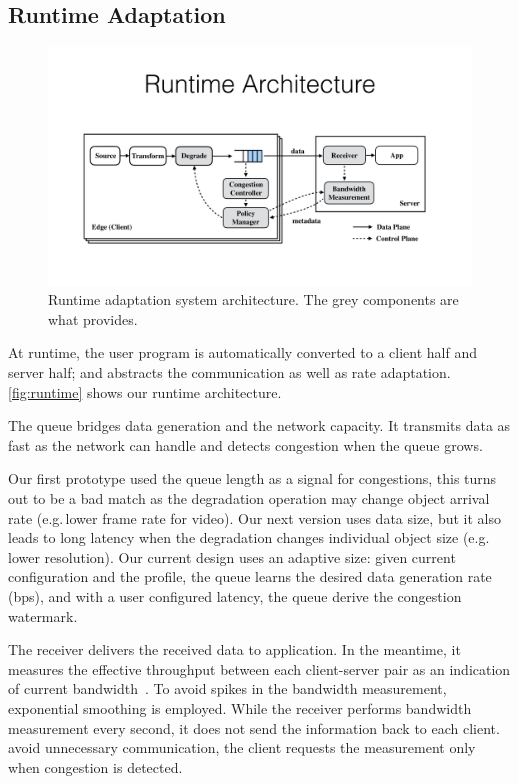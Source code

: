 \subsection{Runtime Adaptation}
\label{sec:adaptation}

\begin{figure}
  \centering
  \includegraphics[width=\linewidth]{figures/runtime.pdf}
  \caption{Runtime adaptation system architecture. The grey components are what
    \sysname{} provides.}
  \label{fig:runtime}
\end{figure}

At runtime, the user program is automatically converted to a client half and
server half; and \sysname{} abstracts the communication as well as rate
adaptation. \autoref{fig:runtime} shows our runtime architecture.

 The queue bridges data generation and
the network capacity. It transmits data as fast as the network can handle and
detects congestion when the queue grows.

 Our first prototype used the queue length as a
signal for congestions, this turns out to be a bad match as the degradation
operation may change object arrival rate (e.g.\,lower frame rate for video). Our
next version uses data size, but it also leads to long latency when the
degradation changes individual object size (e.g.\,lower resolution). Our current
design uses an adaptive size: given current configuration and the profile, the
queue learns the desired data generation rate (bps), and with a user configured
latency, the queue derive the congestion watermark.

 The receiver delivers the received data to
application. In the meantime, it measures the effective throughput between each
client-server pair as an indication of current bandwidth~\cite{iperf}. To avoid
spikes in the bandwidth measurement, exponential smoothing is employed. While
the receiver performs bandwidth measurement every second, it does not send the
information back to each client.  avoid unnecessary communication, the client
requests the measurement only when congestion is detected.

